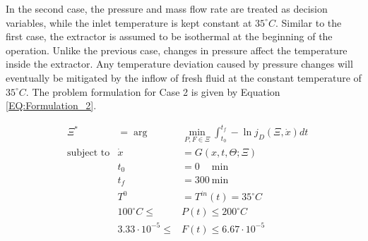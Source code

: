 \documentclass[../Article_Design_of_Experiment.tex]{subfiles}
\begin{document}
	In the second case, the pressure and mass flow rate are treated as decision variables, while the inlet temperature is kept constant at $35^\circ C$. Similar to the first case, the extractor is assumed to be isothermal at the beginning of the operation. Unlike the previous case, changes in pressure affect the temperature inside the extractor. Any temperature deviation caused by pressure changes will eventually be mitigated by the inflow of fresh fluid at the constant temperature of $35^\circ C$. The problem formulation for Case 2 is given by Equation \ref{EQ:Formulation_2}.

	{\footnotesize
		\begin{equation}
			\begin{aligned} 
				&\Xi^* &= \arg &\min_{ P, F \in \Xi} \int_{t_0}^{t_f} - \ln j_D(\Xi,\dot{x}) dt  \\
				&\text{subject to}
				& \dot{x} &= G(x,t,\Theta;\Xi) \\
				&& t_0&=0\quad~\text{min} \\
				&& t_f&=300~\text{min} \\
				&& T^{0} &= T^{in}(t) = 35^\circ C \\
				&& 100^\circ C \leq &P(t) \leq 200^\circ C \\
				&& 3.33 \cdot 10^{-5} \leq &F(t) \leq 6.67 \cdot 10^{-5}
			\end{aligned} \label{EQ:Formulation_2}
	\end{equation} } 
		
\end{document}
